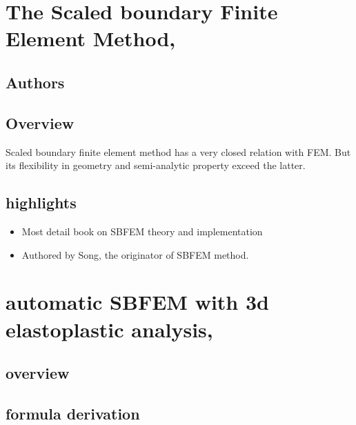 \section{The Scaled boundary Finite Element Method,  \cite{Song-2018-} }
\subsection{Authors}
\citeauthor{Song-2018-}
\subsection{Overview}
Scaled boundary finite element method has a very closed relation with FEM. But its flexibility in geometry and semi-analytic property exceed the latter.
\subsection{highlights}
\begin{itemize}
	\item Most detail book on SBFEM theory and implementation
	\item Authored by Song, the originator of SBFEM method. 
\end{itemize}

\section{automatic SBFEM with 3d elastoplastic analysis,  \cite{Liu-2020-171} }
\subsection{overview}

\subsection{formula derivation}
\begin{equation}


\end{equation}

